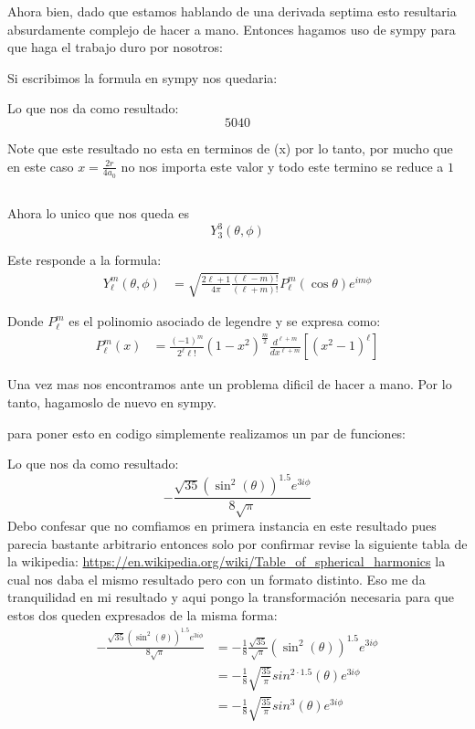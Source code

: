 \documentclass{report}
\begin{document}
Ahora bien, dado que estamos hablando de una derivada septima esto resultaria absurdamente complejo de hacer a mano. Entonces hagamos uso de sympy para que haga el trabajo duro por nosotros:

Si escribimos la formula en sympy nos quedaria:


Lo que nos da como resultado: \[
	5040
\]

Note que este resultado no esta en terminos de (x) por lo tanto, por mucho que en este caso $x = \frac{2r}{4 a_0}$ no nos importa este valor y todo este termino se reduce a $1$

\subsection{}

Ahora lo unico que nos queda es \[
	Y_{3}^{3}\left( \theta, \phi \right)
\]

Este responde a la formula:
\begin{align*}
	Y_\ell^m \left( \theta, \phi \right) &= \sqrt{\frac{2\ell + 1}{4\pi} \frac{\left( \ell - m \right)!}{\left( \ell + m \right)!}}P_\ell^m \left( \cos\theta \right) e^{im\phi}
\end{align*}

Donde $P_\ell^m$ es el polinomio asociado de legendre y se expresa como:
\begin{align*}
	P_\ell^m \left( x \right) &= \frac{\left( -1 \right)^m}{2^\ell \ell!} \left( 1 - x^2 \right)^{\frac{m}{2}} \frac{d^{\ell + m}}{dx^{\ell + m}} \left[ \left( x^2 - 1 \right)^\ell \right]
\end{align*}

Una vez mas nos encontramos ante un problema dificil de hacer a mano. Por lo tanto, hagamoslo de nuevo en sympy.

para poner esto en codigo simplemente realizamos un par de funciones:


Lo que nos da como resultado: \[
	- \frac{\sqrt{35} \left(\sin^{2}{\left(\theta \right)}\right)^{1.5} e^{3 i \phi}}{8 \sqrt{\pi}}
\] Debo confesar que no comfiamos en primera instancia en este resultado pues parecia bastante arbitrario entonces solo por confirmar revise la siguiente tabla de la wikipedia: \url{https://en.wikipedia.org/wiki/Table_of_spherical_harmonics} la cual nos daba el mismo resultado pero con un formato distinto. Eso me da tranquilidad en mi resultado y aqui pongo la transformación necesaria para que estos dos queden expresados de la misma forma:
\begin{align*}
	- \frac{\sqrt{35} \left(\sin^{2}{\left(\theta \right)}\right)^{1.5} e^{3 i \phi}}{8 \sqrt{\pi}} &= - \frac{1}{8}\frac{\sqrt{35}}{\sqrt{\pi}} \left(\sin^{2}{\left(\theta \right)}\right)^{1.5} e^{3 i \phi}\\
	&= - \frac{1}{8}\sqrt{\frac{35}{\pi}} sin^{2 \cdot 1.5}{\left(\theta \right)} e^{3 i \phi}\\
	&= - \frac{1}{8}\sqrt{\frac{35}{\pi}} sin^{3}{\left(\theta \right)} e^{3 i \phi}\\
\end{align*}
\end{document}

